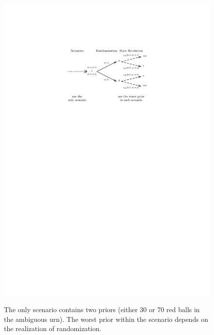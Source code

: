 \documentclass[12pt, notitlepage]{article}
\begin{document}

\begin{figure}[h!]
  \centering   \label{fig_intro_eg2}
    \includegraphics{img/intro_eg2.pdf}
    \caption{The only
scenario contains two priors (either 30 or 70 red balls in the ambiguous
urn). The worst prior within the scenario depends on the realization of
randomization.}
\end{figure}
\end{document}
